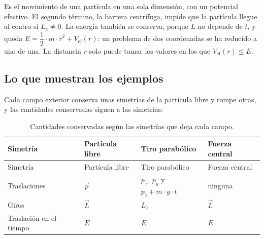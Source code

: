 \documentclass[11pt,a4paper,spanish]{book}
\begin{document}
Es el movimiento de una partícula en una sola dimensión, con un
potencial efectivo. El segundo término, la barrera centrífuga, impide
que la partícula llegue al centro si \(L_z \neq 0\). La energía también
se conserva, porque \(L\) no depende de \(t\), y queda
\(E = \dfrac{1}{2} \cdot m \cdot \dot{r}^2 + V_{\mathrm{ef}}(r)\): un
problema de dos coordenadas se ha reducido a uno de una. La distancia
\(r\) solo puede tomar los valores en los que
\(V_{\mathrm{ef}}(r) \leq E\).

\subsection{Lo que muestran los
ejemplos}\label{lo-que-muestran-los-ejemplos}

Cada campo exterior conserva unas simetrías de la partícula libre y
rompe otras, y las cantidades conservadas siguen a las simetrías:

\begin{longtable}[]{@{}
  >{\raggedright\arraybackslash}p{}
  >{\raggedright\arraybackslash}p{}
  >{\raggedright\arraybackslash}p{}
  >{\raggedright\arraybackslash}p{}@{}}
\caption{Cantidades conservadas según las simetrías que deja cada
campo.}\tabularnewline
\toprule\noalign{}
\begin{minipage}[b]{\linewidth}\raggedright
Simetría
\end{minipage} & \begin{minipage}[b]{\linewidth}\raggedright
Partícula libre
\end{minipage} & \begin{minipage}[b]{\linewidth}\raggedright
Tiro parabólico
\end{minipage} & \begin{minipage}[b]{\linewidth}\raggedright
Fuerza central
\end{minipage} \\
\midrule\noalign{}
\endfirsthead
\toprule\noalign{}
\begin{minipage}[b]{\linewidth}\raggedright
Simetría
\end{minipage} & \begin{minipage}[b]{\linewidth}\raggedright
Partícula libre
\end{minipage} & \begin{minipage}[b]{\linewidth}\raggedright
Tiro parabólico
\end{minipage} & \begin{minipage}[b]{\linewidth}\raggedright
Fuerza central
\end{minipage} \\
\midrule\noalign{}
\endhead
\bottomrule\noalign{}
\endlastfoot
Traslaciones & \(\vec{p}\) & \(p_x\), \(p_y\) y
\(p_z + m \cdot g \cdot t\) & ninguna \\
Giros & \(\vec{L}\) & \(L_z\) & \(\vec{L}\) \\
Traslación en el tiempo & \(E\) & \(E\) & \(E\) \\
\end{longtable}
\end{document}
